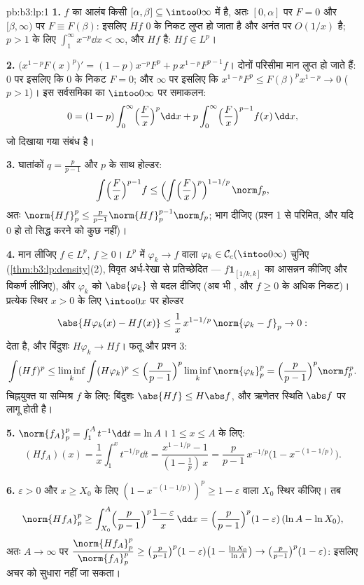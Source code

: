 \begin{solution}{pb:b3:lp:1}
\textbf{1.} $f$ का आलंब किसी $[\alpha, \beta]
\subseteq \intoo0\infty$ में है, अतः $[0, \alpha]$ पर $F = 0$ और
$[\beta, \infty)$ पर $F
\equiv F(\beta)$: इसलिए $Hf$ $0$ के निकट लुप्त हो जाता है और अनंत
पर $O(1/x)$ है; $p > 1$ के लिए $\int_1^\infty x^{-p}\dd x <
\infty$, और $Hf$  है: $Hf \in L^p$।

\textbf{2.} $\bigl(x^{1-p}F(x)^p\bigr)' = (1-p)x^{-p}F^p +
p\,x^{1-p}F^{p-1}f$। दोनों परिसीमा मान लुप्त हो जाते हैं: $0$ पर
इसलिए कि $0$ के निकट $F = 0$; और $\infty$ पर इसलिए कि $x^{1-p}F^p \leq
F(\beta)^p x^{1-p} \to 0$ ($p > 1$)।
इस सर्वसमिका का $\intoo0\infty$ पर समाकलन:
\[
0 = (1 - p)\int_0^\infty\Bigl(\frac Fx\Bigr)^p\dd x
+ p\int_0^\infty\Bigl(\frac Fx\Bigr)^{p-1}f(x)\,\dd x,
\]
जो दिखाया गया संबंध है।

\textbf{3.} घातांकों $q = \frac p{p-1}$ और $p$ के साथ होल्डर:
\[
\int\Bigl(\frac Fx\Bigr)^{p-1}f
\leq \Bigl(\int\Bigl(\frac
Fx\Bigr)^{p}\Bigr)^{1 - 1/p}\,\norm f_p ,
\]
अतः $\norm{Hf}_p^p \leq \frac p{p-1}\norm{Hf}_p^{p-1}\norm
f_p$; भाग दीजिए (प्रश्न 1 से परिमित, और यदि $0$ हो तो सिद्ध
करने को कुछ नहीं)।

\textbf{4.} मान लीजिए $f \in L^p$, $f \geq 0$। $L^p$ में $\varphi_k \to f$ वाला $\varphi_k \in
\mathcal C_c(\intoo0\infty)$ चुनिए
(\cref{thm:b3:lp:density}(2), विवृत अर्ध-रेखा से प्रतिच्छेदित --- $f\mathbf 1_{[1/k, k]}$ का आसन्नन कीजिए
और विकर्ण लीजिए), और $\varphi_k$ को $\abs{\varphi_k}$ से बदल दीजिए (अब भी , और
$f \geq 0$ के अधिक निकट)। प्रत्येक स्थिर $x > 0$ के लिए $\intoo0x$ पर होल्डर
\[
\abs{H\varphi_k(x) - Hf(x)} \leq
\frac1x\,x^{1 - 1/p}\,\norm{\varphi_k - f}_p \to 0 :
\]
देता है, और बिंदुशः $H\varphi_k \to Hf$। फतू और प्रश्न 3:
\[
\int (Hf)^p \leq \liminf_k\int(H\varphi_k)^p
\leq \Bigl(\frac p{p-1}\Bigr)^p\liminf_k\norm{\varphi_k}_p^p
= \Bigl(\frac p{p-1}\Bigr)^p\norm f_p^p .
\]
चिह्नयुक्त या सम्मिश्र $f$ के लिए: बिंदुशः $\abs{Hf} \leq H\abs f$, और ऋणेतर स्थिति
$\abs f$ पर लागू होती है।

\textbf{5.} $\norm{f_A}_p^p = \int_1^A t^{-1}\dd t = \ln A$। $1 \leq x \leq A$ के लिए:
\[
(Hf_A)(x) = \frac1x\int_1^x t^{-1/p}\dd t
= \frac{x^{1 - 1/p} - 1}{(1 - \tfrac1p)\,x}
= \frac p{p-1}\,x^{-1/p}\bigl(1 - x^{-(1 - 1/p)}\bigr).
\]

\textbf{6.} $\varepsilon > 0$ और $x \geq X_0$ के लिए $(1 -
x^{-(1-1/p)})^p \geq 1 - \varepsilon$ वाला $X_0$ स्थिर कीजिए। तब
\[
\norm{Hf_A}_p^p \geq \int_{X_0}^A\Bigl(\frac
p{p-1}\Bigr)^p\frac{1 - \varepsilon}{x}\,\dd x
= \Bigl(\frac p{p-1}\Bigr)^p(1 - \varepsilon)\,(\ln A - \ln
X_0),
\]
अतः $A \to \infty$ पर $\dfrac{\norm{Hf_A}_p^p}{\norm{f_A}_p^p} \geq \bigl(\frac
p{p-1}\bigr)^p(1 - \varepsilon)\bigl(1 - \frac{\ln X_0}{\ln
A}\bigr) \to \bigl(\frac p{p-1}\bigr)^p(1 - \varepsilon)$: इसलिए अचर को सुधारा नहीं जा सकता।


\end{solution}

